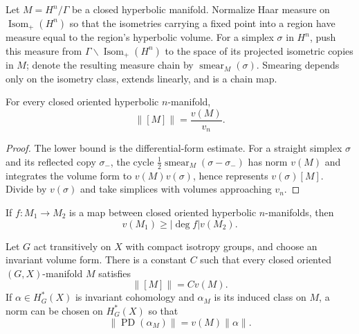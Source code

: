 \begin{definition}[Smearing]
\label{thurston-ch06-smearing}

Let $M=H^n/\Gamma$ be a closed hyperbolic manifold. Normalize Haar measure on $\operatorname{Isom}_+(H^n)$ so that the isometries carrying a fixed point into a region have measure equal to the region's hyperbolic volume. For a simplex $\sigma$ in $H^n$, push this measure from $\Gamma\backslash\operatorname{Isom}_+(H^n)$ to the space of its projected isometric copies in $M$; denote the resulting measure chain by $\operatorname{smear}_M(\sigma)$. Smearing depends only on the isometry class, extends linearly, and is a chain map.
\end{definition}

\begin{theorem}
\label{thurston-ch06-gromov-proportionality}

For every closed oriented hyperbolic $n$-manifold,
\[
\|[M]\|=\frac{v(M)}{v_n}.
\]
\end{theorem}

\begin{proof}
\sketch
The lower bound is the differential-form estimate. For a straight simplex $\sigma$ and its reflected copy $\sigma_-$, the cycle $\frac12\operatorname{smear}_M(\sigma-\sigma_-)$ has norm $v(M)$ and integrates the volume form to $v(M)v(\sigma)$, hence represents $v(\sigma)[M]$. Divide by $v(\sigma)$ and take simplices with volumes approaching $v_n$.
\end{proof}

\begin{corollary}
\label{thurston-ch06-degree-volume}

If $f:M_1\to M_2$ is a map between closed oriented hyperbolic $n$-manifolds, then
\[
v(M_1)\geq|\deg f|v(M_2).
\]
\end{corollary}

\begin{theorem}
\label{thurston-ch06-gx-proportionality}

Let $G$ act transitively on $X$ with compact isotropy groups, and choose an invariant volume form. There is a constant $C$ such that every closed oriented $(G,X)$-manifold $M$ satisfies
\[
\|[M]\|=Cv(M).
\]
If $\alpha\in H_G^*(X)$ is invariant cohomology and $\alpha_M$ is its induced class on $M$, a norm can be chosen on $H_G^*(X)$ so that
\[
\|\operatorname{PD}(\alpha_M)\|=v(M)\|\alpha\|.
\]
\end{theorem}

